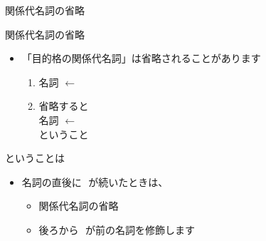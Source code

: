 \documentclass[aspectratio=169,xcolor={dvipsnames,table}]{beamer}
\begin{document}
\begin{frame}[plain]{関係代名詞の省略}
 
\begin{block}{関係代名詞の省略}
\small
\begin{itemize}[square]
 \item  \<「目的格の関係代名詞」は省略されることがあります
\begin{enumerate}\small{}[circle]
 \item<1->  \hspace{50pt}名詞\,\,$\longleftarrow$\,\,
 \item<1->  省略すると\\
\hspace{50pt}名詞\,\,$\longleftarrow$\,\,\\
ということ
 \end{enumerate}
\end{itemize}
     \end{block}


\begin{block}{ということは}
\small
\begin{itemize}[square]
 \item 名詞の直後に\,\,\,\,が続いたときは、
\begin{itemize}[circle]
 \item 関係代名詞の省略

 \item 後ろから\,\,\,\,が前の名詞を修飾します
\end{itemize}
\end{itemize}
     \end{block}
\end{frame}
\end{document}
